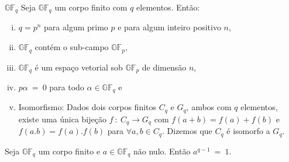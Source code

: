 




\begin{theorem} {\bf $\mathbb{GF}_q$} \label{GFq}  Seja $\mathbb{GF}_q$ um corpo finito com $q$ elementos. Então:
   \begin{enumerate}[(i)]
     \item $q = p^n$ para algum primo $p$ e para algum inteiro positivo $n$,
     \item $\mathbb{GF}_q$ contém o sub-campo $\mathbb{GF}_p$,
     \item $\mathbb{GF}_q$ é um espaço vetorial sob $\mathbb{GF}_p$ de dimensão $n$,
     \item $p\alpha\ =\ 0$ para todo $\alpha \in \mathbb{GF}_q$ e
     \item Isomorfismo:  Dados dois corpos finitos $C_q$ e $G_q$, ambos com $q$ elementos, existe uma única bijeção $f\ :\ C_q \rightarrow G_q$ com $f(a+b)=f(a)+f(b)$ e $f(a.b)=f(a).f(b)$ para $\forall a,b \in C_q$. Dizemos que  $C_q$ é isomorfo a $G_q$.
   \end{enumerate}
\end{theorem}


\begin{theorem} \label{teorema1} Seja $\mathbb{GF}_q$ um corpo finito e $a \in \mathbb{GF}_q$ não nulo. Então $a^{q-1}\ =\ 1$.
\end{theorem}

